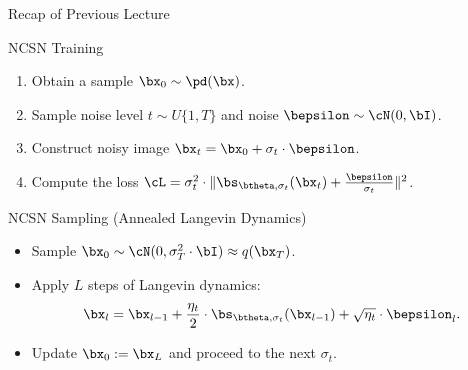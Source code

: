 \documentclass{beamer}
\begin{document}
\begin{frame}{Recap of Previous Lecture}
    \begin{block}{NCSN Training}
        \begin{enumerate}
            \item Obtain a sample $\bx_0 \sim \pd(\bx)$.
            \item Sample noise level $t \sim U\{1, T\}$ and noise $\bepsilon \sim \cN(0, \bI)$.
            \item Construct noisy image $\bx_t = \bx_0 + \sigma_t \cdot \bepsilon$.
            \item Compute the loss $ \cL = \sigma_t^2 \cdot \| \bs_{\btheta, \sigma_t}(\bx_t) + \frac{\bepsilon}{\sigma_t} \|^2 $.
        \end{enumerate}
    \end{block}
    \begin{block}{NCSN Sampling (Annealed Langevin Dynamics)}
        \begin{itemize}
            \item Sample $\bx_0 \sim \cN(0, \sigma_T^2 \cdot \bI) \approx q(\bx_T)$.
            \item Apply $L$ steps of Langevin dynamics:
            \vspace{-0.2cm}
            \[
                \bx_l = \bx_{l-1} + \frac{\eta_t}{2} \cdot \bs_{\btheta, \sigma_t}(\bx_{l - 1}) + \sqrt{\eta_t} \cdot \bepsilon_l.
            \] 
            \vspace{-0.5cm}
            \item Update $\bx_0 := \bx_L$ and proceed to the next $\sigma_t$.
        \end{itemize}
    \end{block}
\end{frame}
\end{document}
